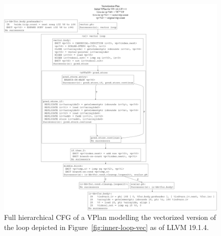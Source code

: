 \documentclass[sigplan,11pt,nonacm]{acmart}
\begin{document}
\begin{figure}
  \centering
  \includegraphics[width=\textwidth]{images/inner-loop-vplan-hcfg.png}
  \caption{Full hierarchical CFG of a VPlan modelling the vectorized version of the loop 
  depicted in Figure~\ref{fig:inner-loop-vec} as of LLVM 19.1.4.}
  \label{fig:inner-loop-vplan-hcfg}
\end{figure}
\end{document}
